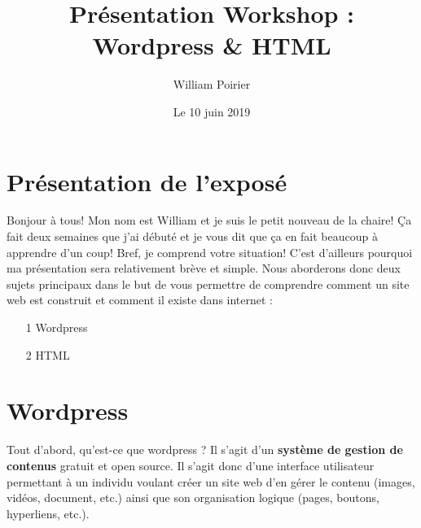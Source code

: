 \documentclass[12pt]{report}
\title{Présentation Workshop : Wordpress \& HTML}
\date{Le 10 juin 2019}
\author{William Poirier}
\begin{document}
\maketitle
\pagebreak

  \section{Présentation de l'exposé}
    Bonjour à tous! Mon nom est William et je suis le petit nouveau de la chaire! Ça fait deux semaines que j'ai débuté et je vous dit que ça en fait beaucoup à apprendre d'un coup! Bref, je comprend votre situation! C'est d'ailleurs pourquoi ma présentation sera relativement brève et simple. Nous aborderons donc deux sujets principaux dans le but de vous permettre de comprendre comment un site web est construit et comment il existe dans internet : \\
    \begin{enumerate}
      \item[1] {\Large Wordpress}
      \item[2] {\Large HTML}
    \end{enumerate}
  
  \section{Wordpress}
    Tout d'abord, qu'est-ce que wordpress ? Il s'agit d'un \textbf{système de gestion de contenus} gratuit et open source. Il s'agit donc d'une interface utilisateur permettant à un individu voulant créer un site web d'en gérer le contenu (images, vidéos, document, etc.) ainsi que son organisation logique (pages, boutons, hyperliens, etc.). \\
\end{document}
